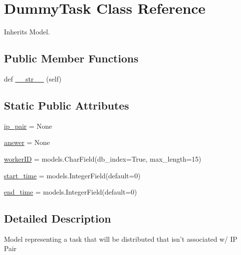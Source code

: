 \hypertarget{classdynamicfilterapp_1_1models_1_1_dummy_task}{}\section{Dummy\+Task Class Reference}
\label{classdynamicfilterapp_1_1models_1_1_dummy_task}


Inherits Model.

\subsection*{Public Member Functions}
\begin{DoxyCompactItemize}
\item 
def \mbox{\hyperlink{classdynamicfilterapp_1_1models_1_1_dummy_task_a23e8041ce1015febe4fdace3225714f9}{\+\_\+\+\_\+str\+\_\+\+\_\+}} (self)
\end{DoxyCompactItemize}
\subsection*{Static Public Attributes}
\begin{DoxyCompactItemize}
\item 
\mbox{\hyperlink{classdynamicfilterapp_1_1models_1_1_dummy_task_a6a81c84f60e4fc0f40d6812d6f6452c7}{ip\+\_\+pair}} = None
\item 
\mbox{\hyperlink{classdynamicfilterapp_1_1models_1_1_dummy_task_a8c4d9ee8d4f82d724070b97e70b9c4e5}{answer}} = None
\item 
\mbox{\hyperlink{classdynamicfilterapp_1_1models_1_1_dummy_task_ab569d6674e112f916cbe81a2304d418f}{worker\+ID}} = models.\+Char\+Field(db\+\_\+index=True, max\+\_\+length=15)
\item 
\mbox{\hyperlink{classdynamicfilterapp_1_1models_1_1_dummy_task_a2530c3908f0179486a4c2255f792e27a}{start\+\_\+time}} = models.\+Integer\+Field(default=0)
\item 
\mbox{\hyperlink{classdynamicfilterapp_1_1models_1_1_dummy_task_aa18736cc12f8beb112bd108c5a09ef8d}{end\+\_\+time}} = models.\+Integer\+Field(default=0)
\end{DoxyCompactItemize}


\subsection{Detailed Description}
\begin{DoxyVerb}Model representing a task that will be distributed that isn't associated w/ IP Pair
\end{DoxyVerb}
 

